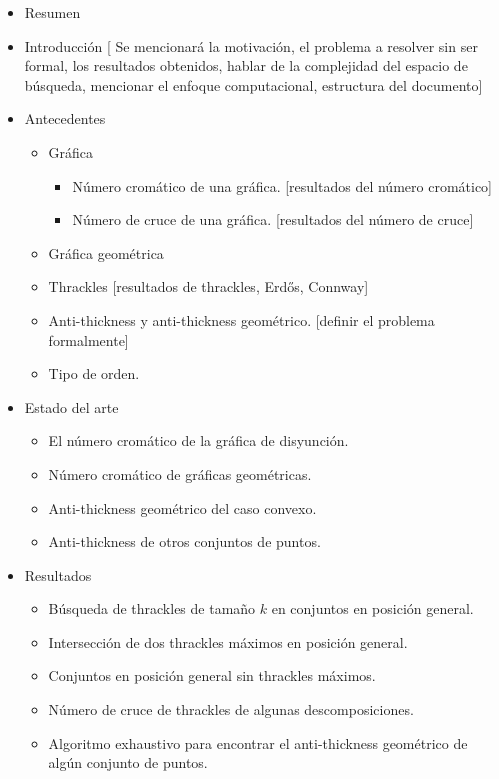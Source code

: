 \documentclass[12pt, letterpaper]{article}
\begin{document}
\begin{itemize}
  \item Resumen
  \item Introducción [ Se mencionará la motivación, el problema a resolver sin ser formal, los resultados obtenidos,
  hablar de la complejidad del espacio de búsqueda, mencionar el enfoque computacional, estructura del documento]
  \item Antecedentes
    \begin{itemize}
      \item Gráfica
      \begin{itemize}
        \item Número cromático de una gráfica. [resultados del número cromático]
        \item Número de cruce de una gráfica. [resultados del número de cruce]
      \end{itemize}
      \item Gráfica geométrica
      \item Thrackles [resultados de thrackles,  Erd\H{o}s, Connway]
      \item Anti-thickness y anti-thickness geométrico. [definir el problema formalmente]
      \item Tipo de orden.
    \end{itemize}
  \item Estado del arte
    \begin{itemize}
      \item El número cromático de la gráfica de disyunción.
      \item Número cromático de gráficas geométricas.
      \item Anti-thickness geométrico del caso convexo.
      \item Anti-thickness de otros conjuntos de puntos.
    \end{itemize}
  \item Resultados
    \begin{itemize}
      \item Búsqueda de thrackles de tamaño $k$ en conjuntos en posición general.
      \item Intersección de dos thrackles máximos en posición general.
      \item Conjuntos en posición general sin thrackles máximos.
      \item Número de cruce de thrackles de algunas descomposiciones.
      \item Algoritmo exhaustivo para encontrar el anti-thickness geométrico de algún conjunto de puntos.

\end{itemize}
\end{itemize}
\end{document}
